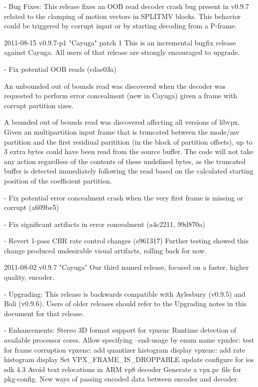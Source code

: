 \begin{DoxyVerbInclude}
  - Bug Fixes:
      This release fixes an OOB read decoder crash bug present in v0.9.7
      related to the clamping of motion vectors in SPLITMV blocks. This
      behavior could be triggered by corrupt input or by starting
      decoding from a P-frame.


2011-08-15 v0.9.7-p1 "Cayuga" patch 1
  This is an incremental bugfix release against Cayuga. All users of that
  release are strongly encouraged to upgrade.

    - Fix potential OOB reads (cdae03a)

          An unbounded out of bounds read was discovered when the
          decoder was requested to perform error concealment (new in
          Cayuga) given a frame with corrupt partition sizes.

          A bounded out of bounds read was discovered affecting all
          versions of libvpx. Given an multipartition input frame that
          is truncated between the mode/mv partition and the first
          residiual paritition (in the block of partition offsets), up
          to 3 extra bytes could have been read from the source buffer.
          The code will not take any action regardless of the contents
          of these undefined bytes, as the truncated buffer is detected
          immediately following the read based on the calculated
          starting position of the coefficient partition.

    - Fix potential error concealment crash when the very first frame
      is missing or corrupt (a609be5)

    - Fix significant artifacts in error concealment (a4c2211, 99d870a)

    - Revert 1-pass CBR rate control changes (e961317)
      Further testing showed this change produced undesirable visual
      artifacts, rolling back for now.


2011-08-02 v0.9.7 "Cayuga"
  Our third named release, focused on a faster, higher quality, encoder.

  - Upgrading:
    This release is backwards compatible with Aylesbury (v0.9.5) and
    Bali (v0.9.6). Users of older releases should refer to the Upgrading
    notes in this document for that release.

  - Enhancements:
          Stereo 3D format support for vpxenc
          Runtime detection of available processor cores.
          Allow specifying --end-usage by enum name
          vpxdec: test for frame corruption
          vpxenc: add quantizer histogram display
          vpxenc: add rate histogram display
          Set VPX_FRAME_IS_DROPPABLE
          update configure for ios sdk 4.3
          Avoid text relocations in ARM vp8 decoder
          Generate a vpx.pc file for pkg-config.
          New ways of passing encoded data between encoder and decoder.


\end{DoxyVerbInclude}
